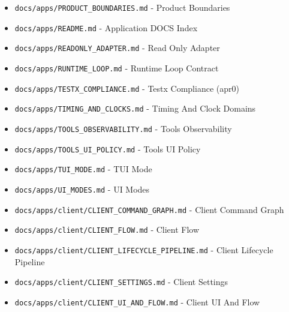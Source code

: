 \documentclass[10.5pt,a4paper,openany]{book}
\begin{document}
\begin{itemize}
\item \texttt{docs/\allowbreak{}apps/\allowbreak{}PRODUCT\_\allowbreak{}BOUNDARIES.\allowbreak{}md} -\allowbreak{} Product Boundaries
\item \texttt{docs/\allowbreak{}apps/\allowbreak{}README.\allowbreak{}md} -\allowbreak{} Application DOCS Index
\item \texttt{docs/\allowbreak{}apps/\allowbreak{}READONLY\_\allowbreak{}ADAPTER.\allowbreak{}md} -\allowbreak{} Read Only Adapter
\item \texttt{docs/\allowbreak{}apps/\allowbreak{}RUNTIME\_\allowbreak{}LOOP.\allowbreak{}md} -\allowbreak{} Runtime Loop Contract
\item \texttt{docs/\allowbreak{}apps/\allowbreak{}TESTX\_\allowbreak{}COMPLIANCE.\allowbreak{}md} -\allowbreak{} Testx Compliance (apr0)
\item \texttt{docs/\allowbreak{}apps/\allowbreak{}TIMING\_\allowbreak{}AND\_\allowbreak{}CLOCKS.\allowbreak{}md} -\allowbreak{} Timing And Clock Domains
\item \texttt{docs/\allowbreak{}apps/\allowbreak{}TOOLS\_\allowbreak{}OBSERVABILITY.\allowbreak{}md} -\allowbreak{} Tools Observability
\item \texttt{docs/\allowbreak{}apps/\allowbreak{}TOOLS\_\allowbreak{}UI\_\allowbreak{}POLICY.\allowbreak{}md} -\allowbreak{} Tools UI Policy
\item \texttt{docs/\allowbreak{}apps/\allowbreak{}TUI\_\allowbreak{}MODE.\allowbreak{}md} -\allowbreak{} TUI Mode
\item \texttt{docs/\allowbreak{}apps/\allowbreak{}UI\_\allowbreak{}MODES.\allowbreak{}md} -\allowbreak{} UI Modes
\item \texttt{docs/\allowbreak{}apps/\allowbreak{}client/\allowbreak{}CLIENT\_\allowbreak{}COMMAND\_\allowbreak{}GRAPH.\allowbreak{}md} -\allowbreak{} Client Command Graph
\item \texttt{docs/\allowbreak{}apps/\allowbreak{}client/\allowbreak{}CLIENT\_\allowbreak{}FLOW.\allowbreak{}md} -\allowbreak{} Client Flow
\item \texttt{docs/\allowbreak{}apps/\allowbreak{}client/\allowbreak{}CLIENT\_\allowbreak{}LIFECYCLE\_\allowbreak{}PIPELINE.\allowbreak{}md} -\allowbreak{} Client Lifecycle Pipeline
\item \texttt{docs/\allowbreak{}apps/\allowbreak{}client/\allowbreak{}CLIENT\_\allowbreak{}SETTINGS.\allowbreak{}md} -\allowbreak{} Client Settings
\item \texttt{docs/\allowbreak{}apps/\allowbreak{}client/\allowbreak{}CLIENT\_\allowbreak{}UI\_\allowbreak{}AND\_\allowbreak{}FLOW.\allowbreak{}md} -\allowbreak{} Client UI And Flow

\end{itemize}
\end{document}
